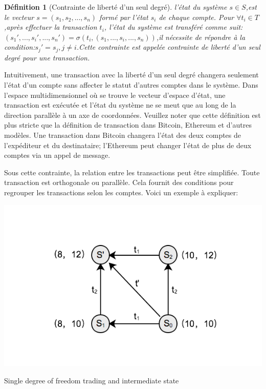 \documentclass[UTF8,nofonts]{article}
\makeatletter
\newtheorem{definition}{Définition}[section]
\newenvironment{figurehere}
 {\def\@captype{figure}}
 {}
\makeatother
\begin{document}
\begin{multicols}{2}
\begin{definition}[Contrainte de liberté d'un seul degré]
l'état du système $s \in S$,est le vecteur $s=(s_{1}, s_{2},...,s_{n})$ formé par l'état $s_{i}$ de chaque compte. Pour $\forall t_{i} \in T$,après effectuer la transaction $t_{i}$, l'état du système est transféré comme suit: $({s_{1}}',..., {s_{i}}',...,{s_{n}}') = \sigma(t_{i}, (s_{1},..., s_{i},...,s_{n}))$,il nécessite de répondre à la condition:${s_{j}}'=s_{j} , j \neq i$.Cette contrainte est appelée contrainte de liberté d'un seul degré pour une transaction.
\end{definition}

Intuitivement, une transaction avec la liberté d'un seul degré changera seulement l'état d'un compte sans affecter le statut d'autres comptes dans le système. Dans l'espace multidimensionnel où se trouve le vecteur d'espace d'état, une transaction est exécutée et l'état du système ne se meut que au long de la direction parallèle à un axe de coordonnées. Veuillez noter que cette définition est plus stricte que la définition de transaction dans Bitcoin, Ethereum et d'autres modèles. Une transaction dans Bitcoin changera l'état des deux comptes de l'expéditeur et du destinataire; l'Ethereum peut changer l'état de plus de deux comptes via un appel de message.

Sous cette contrainte, la relation entre les transactions peut être simplifiée. Toute transaction est orthogonale ou parallèle. Cela fournit des conditions pour regrouper les transactions selon les comptes. Voici un exemple à expliquer:

\begin{center}
\begin{figurehere}
\includegraphics[width=.8\linewidth]{image/tx-deg-of-free.png}
\caption{Single degree of freedom trading and intermediate state}
\end{figurehere}
\end{center}


\end{multicols}
\end{document}
